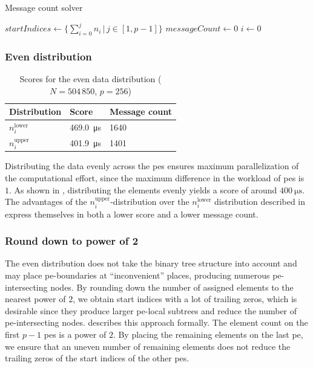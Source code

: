 \begin{algorithm}
\caption{Message count solver}\label{algo:MessageCountSolver}
\DontPrintSemicolon
\SetAlgoLined
$startIndices \gets \{\sum_{i=0}^j n_i \,\big|\, j \in [1, p-1] \}$\;
$messageCount \gets 0$\;
$i \gets 0$\; 
\end{algorithm}



\subsubsection{Even distribution}

\begin{table}
\centering
\begin{tabular}{l|l|l}
Distribution & Score & Message count \\
\hline
$n_i^\textrm{lower}$ & \SI{469.0}{\micro\second} & 1640 \\
$n_i^\textrm{upper}$ & \SI{401.9}{\micro\second} & 1401
\end{tabular}
\caption{Scores for the even data distribution ($N = 504\,850$, $p=256$)}
\label{table:EvenDistributionScores}
\end{table}
Distributing the data evenly across the \glspl{pe} ensures maximum parallelization of the computational effort, since the maximum difference in the workload of \glspl{pe} is $1$.
As shown in , distributing the elements evenly yields a score of around $\SI{400}{\micro\second}$.
The advantages of the $n_i^\textrm{upper}$-distribution over the $n_i^\textrm{lower}$ distribution described in  express themselves in both a lower score and a lower message count.

\subsubsection{Round down to power of 2}
\label{sec:roundDownPower2Distribution}
The even distribution does not take the binary tree structure into account and may place \gls{pe}-boundaries at \enquote{inconvenient} places, producing numerous \gls{pe}-intersecting nodes.
By rounding down the number of assigned elements to the nearest power of $2$, we obtain start indices with a lot of trailing zeros, which is desirable since they produce larger \gls{pe}-local subtrees and reduce the number of \gls{pe}-intersecting nodes.
 describes this approach formally.
The element count on the first $p - 1$ \glspl{pe} is a power of $2$.
By placing the remaining elements on the last \gls{pe}, we ensure that an uneven number of remaining elements does not reduce the trailing zeros of the start indices of the other \glspl{pe}.

